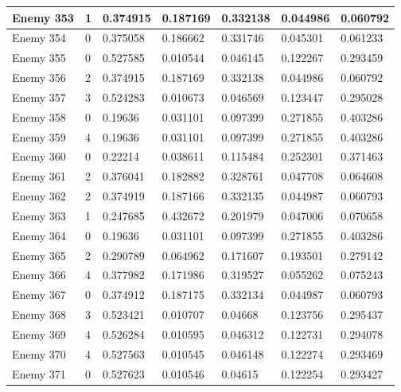 \begin{longtable}{|l|l|l|l|l|l|l|}
	Enemy 353 & 1 & {\color[HTML]{FE0000} 0.374915} & 0.187169 & 0.332138 & 0.044986 & 0.060792 \\ \hline
	Enemy 354 & 0 & {\color[HTML]{009901} 0.375058} & 0.186662 & 0.331746 & 0.045301 & 0.061233 \\ \hline
	Enemy 355 & 0 & {\color[HTML]{009901} 0.527585} & 0.010544 & 0.046145 & 0.122267 & 0.293459 \\ \hline
	Enemy 356 & 2 & 0.374915 & 0.187169 & {\color[HTML]{FE0000} 0.332138} & 0.044986 & 0.060792 \\ \hline
	Enemy 357 & 3 & 0.524283 & 0.010673 & 0.046569 & {\color[HTML]{FE0000} 0.123447} & 0.295028 \\ \hline
	Enemy 358 & 0 & {\color[HTML]{FE0000} 0.19636} & 0.031101 & 0.097399 & 0.271855 & 0.403286 \\ \hline
	Enemy 359 & 4 & 0.19636 & 0.031101 & 0.097399 & 0.271855 & {\color[HTML]{009901} 0.403286} \\ \hline
	Enemy 360 & 0 & {\color[HTML]{FE0000} 0.22214} & 0.038611 & 0.115484 & 0.252301 & 0.371463 \\ \hline
	Enemy 361 & 2 & 0.376041 & 0.182882 & {\color[HTML]{FE0000} 0.328761} & 0.047708 & 0.064608 \\ \hline
	Enemy 362 & 2 & 0.374919 & 0.187166 & {\color[HTML]{FE0000} 0.332135} & 0.044987 & 0.060793 \\ \hline
	Enemy 363 & 1 & 0.247685 & {\color[HTML]{009901} 0.432672} & 0.201979 & 0.047006 & 0.070658 \\ \hline
	Enemy 364 & 0 & {\color[HTML]{FE0000} 0.19636} & 0.031101 & 0.097399 & 0.271855 & 0.403286 \\ \hline
	Enemy 365 & 2 & 0.290789 & 0.064962 & {\color[HTML]{FE0000} 0.171607} & 0.193501 & 0.279142 \\ \hline
	Enemy 366 & 4 & 0.377982 & 0.171986 & 0.319527 & 0.055262 & {\color[HTML]{FE0000} 0.075243} \\ \hline
	Enemy 367 & 0 & {\color[HTML]{009901} 0.374912} & 0.187175 & 0.332134 & 0.044987 & 0.060793 \\ \hline
	Enemy 368 & 3 & 0.523421 & 0.010707 & 0.04668 & {\color[HTML]{FE0000} 0.123756} & 0.295437 \\ \hline
	Enemy 369 & 4 & 0.526284 & 0.010595 & 0.046312 & 0.122731 & {\color[HTML]{FE0000} 0.294078} \\ \hline
	Enemy 370 & 4 & 0.527563 & 0.010545 & 0.046148 & 0.122274 & {\color[HTML]{FE0000} 0.293469} \\ \hline
	Enemy 371 & 0 & {\color[HTML]{009901} 0.527623} & 0.010546 & 0.04615 & 0.122254 & 0.293427 \\ \hline

\end{longtable}
